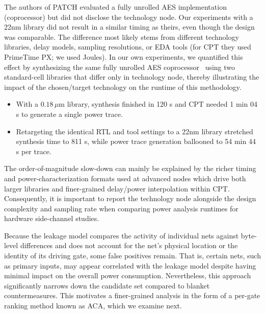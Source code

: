 \documentclass[sigconf]{acmart}
\begin{document}
The authors of PATCH evaluated a fully unrolled AES implementation (coprocessor) \cite{unrolledAED} but did not disclose the technology node.  Our experiments with a 22nm library did not result in a similar timing as theirs, even though the design was comparable. The difference most likely stems from different technology libraries, delay models, sampling resolutions, or EDA tools (for CPT they used PrimeTime PX; we used Joules). In our own experiments, we quantified this effect by synthesizing the same fully unrolled AES coprocessor~\cite{unrolledAED} using two standard-cell libraries that differ only in technology node, thereby illustrating the impact of the chosen/target technology on the runtime of this methodology.
\begin{itemize}[leftmargin=1.5em, nosep]
  \item With a $0.18\,\mu\text{m}$ library, synthesis finished in 120 s and CPT needed 1 min 04 s to generate a single power trace.

   \item Retargeting the identical RTL and tool settings to a 22nm library stretched synthesis time to 811 s, while power trace generation ballooned to 54 min 44 s per trace.
\end{itemize}
The order-of-magnitude slow-down can mainly be explained by the richer timing and power-characterization formats used at advanced nodes which drive both larger libraries and finer-grained delay/power interpolation within CPT. Consequently, it is important to report the technology node alongside the design complexity and sampling rate when comparing power analysis runtimes for hardware side-channel studies.

Because the leakage model compares the activity of individual nets against byte-level differences and does not account for the net’s physical location or the identity of its driving gate, some false positives remain. That is, certain nets, such as primary inputs, may appear correlated with the leakage model despite having minimal impact on the overall power consumption. Nevertheless, this approach significantly narrows down the candidate set compared to blanket countermeasures. This motivates a finer-grained analysis in the form of a per-gate ranking method known as ACA, which we examine next.


\end{document}
